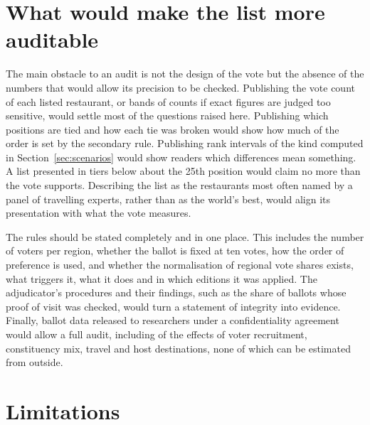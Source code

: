 \documentclass[11pt,a4paper]{article}
\begin{document}
\section{What would make the list more auditable}\label{sec:remedies}

The main obstacle to an audit is not the design of the vote but the absence of the numbers that would allow its precision to be checked. Publishing the vote count of each listed restaurant, or bands of counts if exact figures are judged too sensitive, would settle most of the questions raised here. Publishing which positions are tied and how each tie was broken would show how much of the order is set by the secondary rule. Publishing rank intervals of the kind computed in Section~\ref{sec:scenarios} would show readers which differences mean something. A list presented in tiers below about the 25th position would claim no more than the vote supports. Describing the list as the restaurants most often named by a panel of travelling experts, rather than as the world's best, would align its presentation with what the vote measures.

The rules should be stated completely and in one place. This includes the number of voters per region, whether the ballot is fixed at ten votes, how the order of preference is used, and whether the normalisation of regional vote shares exists, what triggers it, what it does and in which editions it was applied. The adjudicator's procedures and their findings, such as the share of ballots whose proof of visit was checked, would turn a statement of integrity into evidence. Finally, ballot data released to researchers under a confidentiality agreement would allow a full audit, including of the effects of voter recruitment, constituency mix, travel and host destinations, none of which can be estimated from outside.

\section{Limitations}
\end{document}
